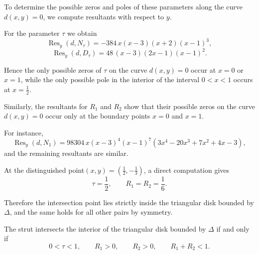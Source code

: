 \documentclass[12pt]{article}
\begin{document}
To determine the possible zeros and poles of these parameters
along the curve \(d(x,y)=0\),
we compute resultants with respect to \(y\).

For the parameter \(\tau\) we obtain
\[
\operatorname{Res}_y(d,N_\tau)
=
-384\,x(x-3)(x+2)(x-1)^3,
\]
\[
\operatorname{Res}_y(d,D_\tau)
=
48\,(x-3)(2x-1)(x-1)^2 .
\]

Hence the only possible zeros of \(\tau\) on the curve \(d(x,y)=0\)
occur at \(x=0\) or \(x=1\),
while the only possible pole in the interior of the interval
\(0<x<1\) occurs at \(x=\frac12\).


Similarly, the resultants for \(R_1\) and \(R_2\)
show that their possible zeros on the curve \(d(x,y)=0\)
occur only at the boundary points \(x=0\) and \(x=1\).

For instance,
\[
\operatorname{Res}_y(d,N_1)
=
98304\,x(x-3)^4(x-1)^7(3x^4-20x^3+7x^2+4x-3),
\]
and the remaining resultants are similar.


At the distinguished point$(x,y)=\left(\frac12,-\frac13\right)$,
a direct computation gives
\[
\tau=\frac12,\qquad
R_1=R_2=\frac16 .
\]

Therefore the intersection point lies strictly inside
the triangular disk bounded by \(\Delta\),
and the same holds for all other pairs by symmetry.



The strut intersects the interior of the triangular disk bounded by $\Delta$
if and only if
\[
0<\tau<1, \qquad
R_1>0, \qquad
R_2>0, \qquad
R_1+R_2<1.
\]

%
%
%
%
\end{document}

